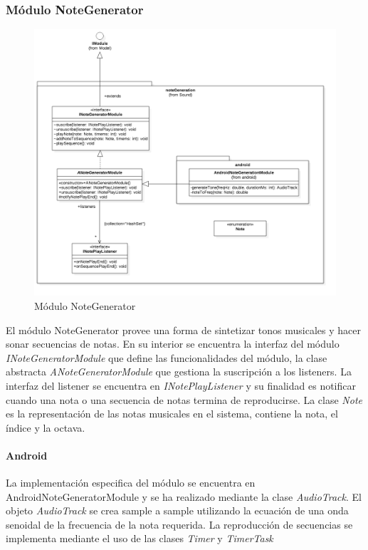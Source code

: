 \subsubsection{Módulo NoteGenerator}
\begin{figure}
	\centering
	\includegraphics[width=1\linewidth]{imagenes/diagramas/NoteGenerationModule.png}
	\caption{Módulo NoteGenerator}
	\label{fig:note-generator-module}
\end{figure}
El módulo NoteGenerator provee una forma de sintetizar tonos musicales y hacer sonar secuencias de notas.
En su interior se encuentra la interfaz del módulo \textit{INoteGeneratorModule} que define las funcionalidades del módulo, la clase abstracta \textit{ANoteGeneratorModule} que gestiona la suscripción a los listeners. La interfaz del listener se encuentra en \textit{INotePlayListener} y su finalidad es notificar cuando una nota o una secuencia de notas termina de reproducirse. La clase \textit{Note} es la representación de las notas musicales en el sistema, contiene la nota, el índice y la octava.

\paragraph*{Android\\}

La implementación especifica del módulo se encuentra en AndroidNoteGeneratorModule y se ha realizado mediante la clase \textit{AudioTrack}. El objeto \textit{AudioTrack} se crea sample a sample utilizando la ecuación de una onda senoidal de la frecuencia de la nota requerida. La reproducción de secuencias se implementa mediante el uso de las clases \textit{Timer} y \textit{TimerTask}


